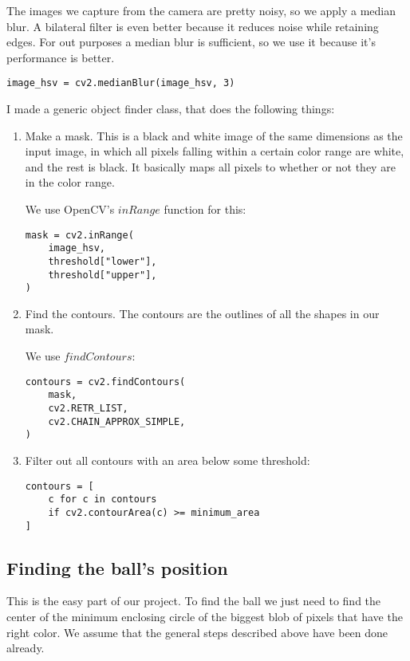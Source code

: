 \documentclass[12pt, a4paper]{article}
\begin{document}
The images we capture from the camera are pretty noisy, so we apply a median blur. A bilateral filter is even better because it reduces noise while retaining edges. For out purposes a median blur is sufficient, so we use it because it's performance is better. \cite{openCVImageSmoothing}

\begin{lstlisting}
image_hsv = cv2.medianBlur(image_hsv, 3)
\end{lstlisting}

I made a generic object finder class, that does the following things:
\begin{enumerate}
	\item Make a mask. This is a black and white image of the same dimensions as the input image, in which all pixels falling within a certain color range are white, and the rest is black. It basically maps all pixels to whether or not they are in the color range.

	We use OpenCV's $inRange$ function for this:

	\begin{lstlisting}
mask = cv2.inRange(
	image_hsv,
	threshold["lower"],
	threshold["upper"],
)
	\end{lstlisting}
	\item Find the contours. The contours are the outlines of all the shapes in our mask.

	We use $findContours$:

	\begin{lstlisting}
contours = cv2.findContours(
	mask,
	cv2.RETR_LIST,
	cv2.CHAIN_APPROX_SIMPLE,
)
	\end{lstlisting}
	\item Filter out all contours with an area below some threshold:

	\begin{lstlisting}
contours = [
	c for c in contours
	if cv2.contourArea(c) >= minimum_area
]
	\end{lstlisting}
\end{enumerate}

\subsection{Finding the ball's position}
This is the easy part of our project. To find the ball we just need to find the center of the minimum enclosing circle of the biggest blob of pixels that have the right color. We assume that the general steps described above have been done already.
\end{document}
